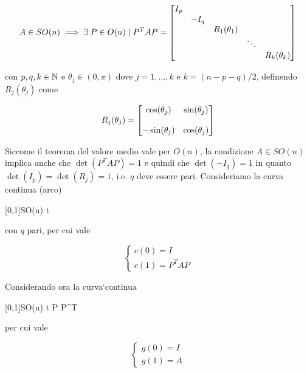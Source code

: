 \begin{equation}
	A \in SO(n) %
	\implies %
	\E P \in O(n) \mid P^{T} A P = %
	\bmqty{ %
			\dmat{ %
					I_{p}, %
					- I_{q}, %
					R_{1}(\theta_{1}), %
					\ddots, %
					R_{k}(\theta_{k}) %
					} %
			}
\end{equation}

con $ p,q,k \in \mathbb{N} $ e $ \theta_{j} \in (0,\pi) $ dove $ j=1,\dots,k $ e $ k = (n-p-q)/2 $, definendo $ R_{j}(\theta_{j}) $ come

\begin{equation}
	R_{j}(\theta_{j}) = %
	\bmqty{ %
			\cos(\theta_{j}) & \sin(\theta_{j}) \\\\
			- \sin(\theta_{j}) & \cos(\theta_{j}) %
			}
\end{equation}

Siccome il teorema del valore medio vale per $ O(n) $, la condizione $ A \in SO(n) $ implica anche che $ \det(P^{T} A P) = 1 $ e quindi che $ \det(-I_{q}) = 1 $ in quanto $ \det(I_{p}) = \det(R_{j}) = 1 $, i.e. $ q $ deve essere pari. Consideriamo la curva continua (arco)

	{[0,1]}{SO(n)}
	{t}{ %
		}

con $ q $ pari, per cui vale

\begin{equation}
	\begin{cases}
		c(0) = I \\
		c(1) = P^{T} A P
	\end{cases}
\end{equation}

Considerando ora la curva`continua

%
	{[0,1]}{SO(n)}%
	{t}{ P  P^{T} %
	}

per cui vale

\begin{equation}
	\begin{cases}
		g(0) = I \\
		g(1) = A
	\end{cases}
\end{equation}

